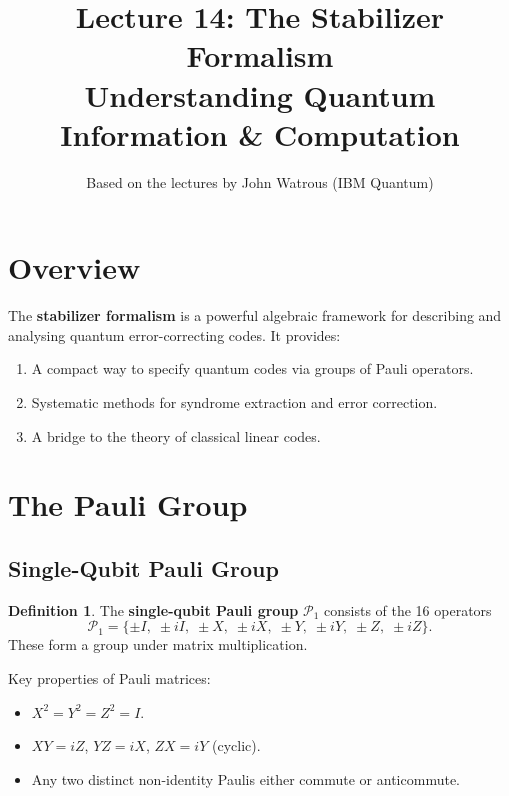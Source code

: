 \documentclass[11pt]{article}
\title{\textbf{Lecture 14: The Stabilizer Formalism} \\ \large Understanding Quantum Information \& Computation}
\author{Based on the lectures by John Watrous (IBM Quantum)}
\date{}
\theoremstyle{definition}
\newtheorem{definition}{Definition}[section]
\begin{document}
\maketitle
\tableofcontents
\newpage

\section{Overview}

The \textbf{stabilizer formalism} is a powerful algebraic framework for describing and analysing quantum error-correcting codes.  It provides:
\begin{enumerate}
    \item A compact way to specify quantum codes via groups of Pauli operators.
    \item Systematic methods for syndrome extraction and error correction.
    \item A bridge to the theory of classical linear codes.
\end{enumerate}

\section{The Pauli Group}

\subsection{Single-Qubit Pauli Group}

\begin{definition}
The \textbf{single-qubit Pauli group} $\mathcal{P}_1$ consists of the 16 operators
\[
    \mathcal{P}_1 = \{\pm I,\;\pm iI,\;\pm X,\;\pm iX,\;\pm Y,\;\pm iY,\;\pm Z,\;\pm iZ\}.
\]
These form a group under matrix multiplication.
\end{definition}

Key properties of Pauli matrices:
\begin{itemize}
    \item $X^2=Y^2=Z^2=I$.
    \item $XY=iZ$, $YZ=iX$, $ZX=iY$ (cyclic).
    \item Any two distinct non-identity Paulis either commute or anticommute.
\end{itemize}
\end{document}
